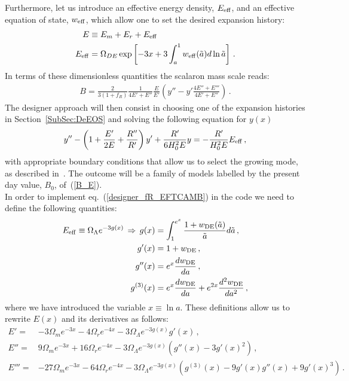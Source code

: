 \documentclass[prd,nofootinbib,showpacs]{revtex4}
\def\be{\begin{equation}}
\def\ee{\end{equation}}
\def\l{\left}
\def\r{\right}
\def\f{\frac}
\begin{document}
{Furthermore, let us introduce an effective energy density, $E_{\rm{eff}}$, and an effective equation of state, $w_{\rm eff}$, which allow one to set the desired expansion history:
\begin{align}\label{E_Hubble}
E&\equiv E_m+E_r+E_{\rm{eff}}\nonumber\\
E_{\rm{eff}}&= \Omega_{DE}\exp\left[-3x+3\int_a^1 w_{\rm{eff}}(\tilde{a}) d\ln\tilde{a} \right]\,.
\end{align} 
In terms of these dimensionless quantities the scalaron mass scale reads:
\begin{align}\label{B_E}
B =\frac{2}{3(1+f_R)}\frac{1}{4 E'+E''}\frac{E}{E'}\left(y'' -y'\frac{4 E''+E'''}{4 E' + E''} \right)\,.
\end{align}
The designer approach will then consist in choosing one of the expansion histories in Section~\ref{SubSec:DeEOS} and solving the following equation for $y(x)$
\be\label{designer_fR_EFTCAMB}
y''-\l(1+\f{E'}{2E}+\f{R''}{R'}\r)y'+\f{R'}{6H_0^2E}y=-\f{R'}{H_0^2E}E_{\rm eff}\,,
\ee
with appropriate boundary conditions that allow us to select the growing mode, as described in~\cite{Pogosian:2007sw}. 
The outcome will be a family of models labelled by the present day value, $B_0$, of~(\ref{B_E}).  \\
In order to implement eq.~(\ref{designer_fR_EFTCAMB}) in the code we need to define the following quantities:
\begin{align}
E_{\rm eff} \equiv \Omega_{\Lambda} e^{-3g(x)} \, \Rightarrow \, g(x) &= \int_1^{e^x} \frac{1+w_{\rm DE}(\tilde{a})}{\tilde{a}} d\tilde{a} \,, \nonumber \\
g'(x) &= 1+w_{\rm DE} \,, \nonumber \\
g''(x) &= e^x \frac{d w_{\rm DE}}{da} \,, \nonumber \\
g^{(3)}(x) &= e^x \frac{d w_{\rm DE}}{da} + e^{2x} \frac{d^2 w_{\rm DE}}{da^2} \,,
\end{align}
%
where we have introduced the variable $x\equiv \ln a$.
These definitions allow us to rewrite $E(x)$ and its derivatives as follows:
%
\begin{align}
E' =& -3\Omega_m e^{-3x}-4\Omega_re^{-4x} -3\Omega_\Lambda e^{-3g(x)}g'(x) \, ,\nonumber\\
E''=& 9 \Omega_m e^{-3x} + 16\Omega_r e^{-4x} -3\Omega_\Lambda e^{-3g(x)}\left(g''(x) -3g'(x)^2 \right) \, ,\nonumber\\
E''' =& -27 \Omega_m e^{-3x} -64 \Omega_r e^{-4x} -3\Omega_\Lambda e^{-3g(x)}\left(g^{(3)}(x) -9 g'(x)g''(x) +9 g'(x)^3\right)\,.
\end{align}
}
\end{document}

